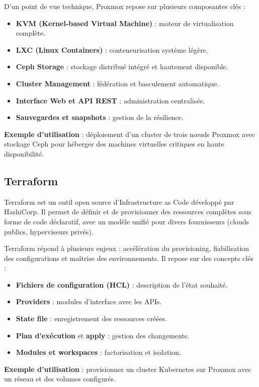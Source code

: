 D’un point de vue technique, Proxmox repose sur plusieurs composantes clés :
\begin{itemize}
	\item \textbf{KVM (Kernel-based Virtual Machine)} : moteur de virtualisation complète.
	\item \textbf{LXC (Linux Containers)} : conteneurisation système légère.
	\item \textbf{Ceph Storage} : stockage distribué intégré et hautement disponible.
	\item \textbf{Cluster Management} : fédération et basculement automatique.
	\item \textbf{Interface Web et API REST} : administration centralisée.
	\item \textbf{Sauvegardes et snapshots} : gestion de la résilience.
\end{itemize}

\textbf{Exemple d’utilisation} : déploiement d’un cluster de trois nœuds Proxmox avec stockage Ceph pour héberger des machines virtuelles critiques en haute disponibilité.

\subsection{Terraform}

Terraform est un outil open source d’Infrastructure as Code développé par HashiCorp. Il permet de définir et de provisionner des ressources complètes sous forme de code déclaratif, avec un modèle unifié pour divers fournisseurs (clouds publics, hyperviseurs privés).

Terraform répond à plusieurs enjeux : accélération du provisioning, fiabilisation des configurations et maîtrise des environnements. Il repose sur des concepts clés :
\begin{itemize}
	\item \textbf{Fichiers de configuration (HCL)} : description de l’état souhaité.
	\item \textbf{Providers} : modules d’interface avec les APIs.
	\item \textbf{State file} : enregistrement des ressources créées.
	\item \textbf{Plan d’exécution} et \textbf{apply} : gestion des changements.
	\item \textbf{Modules et workspaces} : factorisation et isolation.
\end{itemize}

\textbf{Exemple d’utilisation} : provisionner un cluster Kubernetes sur Proxmox avec un réseau et des volumes configurés.

